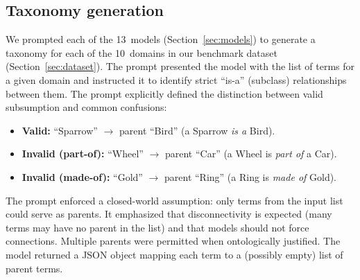 \documentclass{IOS-Book-Article}
\begin{document}
%
%
%
%
%
%
%

\subsection{Taxonomy generation}

We prompted each of the 13~models (Section~\ref{sec:models}) to
generate a taxonomy for each of the 10~domains in our benchmark
dataset (Section~\ref{sec:dataset}).  The prompt presented the model
with the list of terms for a given domain and instructed it to identify
strict ``is-a'' (subclass) relationships between them.  The prompt
explicitly defined the distinction between valid subsumption and common
confusions:

\begin{itemize}
\item \textbf{Valid:} ``Sparrow'' $\rightarrow$ parent ``Bird'' (a
  Sparrow \emph{is a} Bird).
\item \textbf{Invalid (part-of):} ``Wheel'' $\rightarrow$ parent
  ``Car'' (a Wheel is \emph{part of} a Car).
\item \textbf{Invalid (made-of):} ``Gold'' $\rightarrow$ parent
  ``Ring'' (a Ring is \emph{made of} Gold).
\end{itemize}

The prompt enforced a closed-world assumption: only terms from the
input list could serve as parents.  It emphasized that disconnectivity
is expected (many terms may have no parent in the list) and that
models should not force connections.  Multiple parents were permitted
when ontologically justified.  The model returned a JSON object mapping
each term to a (possibly empty) list of parent terms.
\end{document}
